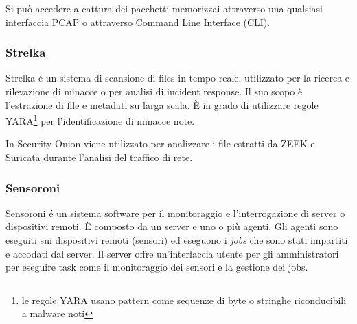 Si può accedere a cattura dei pacchetti memorizzai attraverso una qualsiasi interfaccia PCAP o attraverso Command Line Interface (CLI).

\subsubsection*{Strelka}
Strelka \cite{strelka} é un sistema di scansione di files in tempo reale, utilizzato per la ricerca e rilevazione di minacce o per analisi di incident response. Il suo scopo è l'estrazione di file e metadati su larga scala. È in grado di utilizzare regole YARA\footnote{le regole YARA usano pattern  come sequenze  di byte  o stringhe riconducibili  a malware noti } per l'identificazione di minacce note.

In Security Onion viene utilizzato per analizzare i file estratti da ZEEK e Suricata durante l'analisi del traffico di rete.

\subsubsection*{Sensoroni}
Sensoroni \cite{sensoroni} é un sistema software per il monitoraggio e l'interrogazione di server o dispositivi remoti.
È composto da un server e uno o più agenti.
Gli agenti sono  eseguiti sui dispositivi remoti (sensori) ed eseguono i \textit{jobs} che sono stati impartiti e accodati dal server. 
Il server offre un'interfaccia utente per gli amministratori per eseguire task come il monitoraggio dei sensori e la gestione dei jobs.

